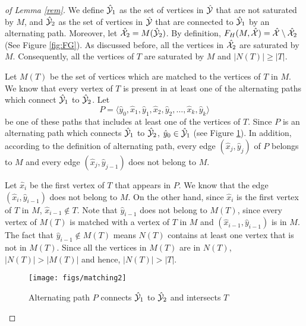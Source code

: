 \begin{proof}[of Lemma \ref{rem}]
We define $\hat{\mathcal{Y}}_1$ as the set of vertices in $\hat{\mathcal{Y}}$ that are not saturated by $M$, and $\hat{\mathcal{Y}}_2$ as the set of vertices in $\hat{\mathcal{Y}}$ that are connected to $\hat{\mathcal{Y}}_1$ by an alternating path. Moreover, let $\hat{\mathcal{X}}_2 = M(\hat{\mathcal{Y}}_2)$. By definition, $F_{H}(M,\hat{\mathcal{X}}) = \hat{\mathcal{X}} \setminus \hat{\mathcal{X}}_2$ (See Figure \ref{fig:FG}). As discussed before, all the vertices in $\hat{\mathcal{X}}_2$ are saturated by $M$. Consequently, all the vertices of $T$ are saturated by $M$ and $|N(T)| \geq |T|$. 

Let $M(T)$ be the set of vertices which are matched to the vertices of $T$ in $M$. We know that every vertex of $T$ is present in at least one of the alternating paths which connect $\hat{\mathcal{Y}}_1$ to $\hat{\mathcal{Y}}_2$. Let $$P = \langle \hat{y}_0, \hat{x}_1, \hat{y}_1, \hat{x}_2, \hat{y}_2, \ldots, \hat{x}_k, \hat{y}_k \rangle$$ be one of these paths that includes at least one of the vertices of $T$. Since $P$ is an alternating path which connects $\hat{\mathcal{Y}}_1$ to $\hat{\mathcal{Y}}_2$, $\hat{y}_0 \in \hat{\mathcal{Y}}_1$ (see Figure \ref{fig:FG4}). In addition, according to the definition of alternating path, every edge $(\hat{x}_j,\hat{y}_j)$ of $P$ belongs to $M$ and every edge $(\hat{x}_j,\hat{y}_{j-1})$ does not belong to $M$. 

Let $\hat{x}_i$ be the first vertex of $T$ that appears in $P$. We know that the edge $(\hat{x}_i,\hat{y}_{i-1})$ does not belong to $M$. On the other hand, since $\hat{x}_i$ is the first vertex of $T$ in $M$, $\hat{x}_{i-1} \notin T$. Note that $\hat{y}_{i-1}$ does not belong to $M(T)$, since every vertex of $M(T)$ is matched with a vertex of $T$ in $M$ and $(\hat{x}_{i-1},\hat{y}_{i-1})$ is in $M$.  The fact that $\hat{y}_{i-1} \notin M(T)$ means $N(T)$ contains at least one vertex that is not in $M(T)$. Since all the vertices in $M(T)$ are in $N(T)$, $|N(T)|>|M(T)|$ and hence, $|N(T)|>|T|$.
\begin{figure}
\centering
\texttt{[image: figs/matching2]}
\caption{Alternating path $P$ connects ${\hat{\cal Y}}_1$ to ${\hat{\cal Y}}_2$ and intersects $T$}
\label{fig:FG4}
\end{figure}
\begin{comment}
Suppose $x_i$ is the first vertex of $T$ in $P$. Since $x_1 \in \parttwo_1$, $x_i \neq x_1$. By the assumption that $x_{i}$ is the first vertex of $T$ in $P$, $x_{i-1}$ does not belong to $T$. In addition, $x_{i-1}$ is connected to $x_i$, since $(x_i,x_{i-1})$ is an edge of $P$. Thus, the vertices in $T$ have at least one neighbour, which is not in $M(T)$. Therefore, $N(T) = M(T)$ cannot hold, and we have $|N(T)| > |M(T)|$ which yields $|N(T)| > |T|$.
\end{comment}
\end{proof}



